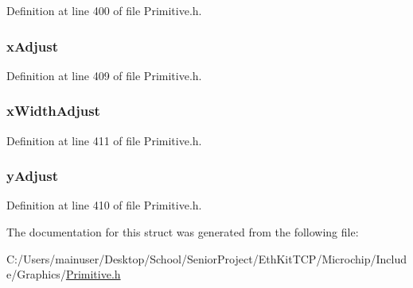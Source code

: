 Definition at line 400 of file Primitive.\+h.

\hypertarget{struct_o_u_t_c_h_a_r___p_a_r_a_m_a4b7e678aa4ba85c4eed9db0690b92766}{}
\subsubsection[{x\+Adjust}]{ x\+Adjust}\label{struct_o_u_t_c_h_a_r___p_a_r_a_m_a4b7e678aa4ba85c4eed9db0690b92766}


Definition at line 409 of file Primitive.\+h.

\hypertarget{struct_o_u_t_c_h_a_r___p_a_r_a_m_a310f15171b86366695ce6b3ab5c86204}{}
\subsubsection[{x\+Width\+Adjust}]{ x\+Width\+Adjust}\label{struct_o_u_t_c_h_a_r___p_a_r_a_m_a310f15171b86366695ce6b3ab5c86204}


Definition at line 411 of file Primitive.\+h.

\hypertarget{struct_o_u_t_c_h_a_r___p_a_r_a_m_a0e14b49125d3870244e6ace48f934415}{}
\subsubsection[{y\+Adjust}]{ y\+Adjust}\label{struct_o_u_t_c_h_a_r___p_a_r_a_m_a0e14b49125d3870244e6ace48f934415}


Definition at line 410 of file Primitive.\+h.



The documentation for this struct was generated from the following file\+:\begin{DoxyCompactItemize}
\item 
C\+:/\+Users/mainuser/\+Desktop/\+School/\+Senior\+Project/\+Eth\+Kit\+T\+C\+P/\+Microchip/\+Include/\+Graphics/\hyperlink{_primitive_8h}{Primitive.\+h}\end{DoxyCompactItemize}
